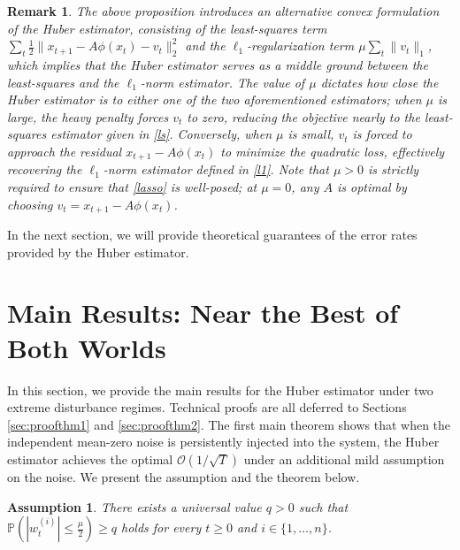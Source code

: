 \documentclass[letterpaper,10pt,conference]{ieeeconf}
\theoremstyle{plain} %
\theoremstyle{plain} %
\theoremstyle{plain} %
\newtheorem{assumption}{Assumption}
\theoremstyle{plain}
\newtheorem{remark}{Remark}
\begin{document}
\begin{remark}\label{propremark}
 The above proposition introduces an alternative convex formulation of the Huber estimator, consisting of the least-squares term $\sum_t\frac{1}{2} \|x_{t+1} - A\phi(x_t)-v_t\|_2^2$ and the $\ell_1$-regularization term $\mu\sum_t \|v_t\|_1$, which implies that the Huber estimator serves as a middle ground between the least-squares and the $\ell_1$-norm estimator. The value of $\mu$ dictates how close the Huber estimator is to either one of the two aforementioned estimators; 
 when $\mu$ is large, the heavy penalty forces $v_t$ to zero, reducing the objective nearly to the  least-squares estimator given in \eqref{ls}.
 Conversely, when $\mu$ is small,  $v_t$ is forced to approach the residual $x_{t+1} - A\phi(x_t)$ to minimize the quadratic loss, effectively recovering the $\ell_1$-norm estimator defined in \eqref{l1}.  Note that $\mu>0$ is strictly required to ensure that \eqref{lasso} is well-posed; at $\mu=0$, any $A$ is optimal by choosing  $v_t = x_{t+1} - A\phi(x_t)$.
\end{remark}


In the next section, we will provide  theoretical guarantees of the error rates provided by the Huber estimator.

\section{Main Results: Near the Best of Both Worlds}\label{sec:mainresults}

In this section, we provide the main results for the Huber estimator under two extreme disturbance regimes. Technical proofs are all deferred to Sections \ref{sec:proofthm1} and \ref{sec:proofthm2}. The first main theorem shows that when the independent mean-zero noise is persistently injected into the system, the Huber estimator achieves the optimal $\mathcal{O}(1/\sqrt{T})$ under an additional mild assumption on the noise. We present the assumption and the theorem below.

\begin{assumption}\label{as:mildinnoise}
      There exists a universal value $q>0$ such that 
      $\mathbb{P}(|w_t^{(i)}|\le \frac{\mu}{2} ) \ge q $ holds for every $t\ge0$ and $i\in\{1,\dots,n\}$.
\end{assumption}
\end{document}
